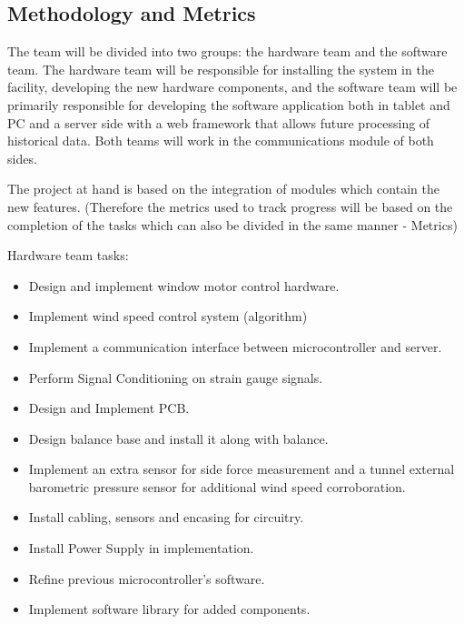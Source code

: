 \subsection{Methodology and Metrics}


	The team will be divided into two groups: the hardware team and the software team. The
	hardware team will be responsible for installing the system in the facility, developing the new
	hardware components, and the software team will be primarily responsible for developing the
	software application both in tablet and PC and a server side with a web framework that allows
	future processing of historical data. Both teams will work in the communications module of both
	sides.

	The project at hand is based on the integration of modules which contain the new features.
	(Therefore the metrics used to track progress will be based on the completion of the tasks which
	can also be divided in the same manner - Metrics)

	Hardware team tasks:
	\begin{itemize}
		\item Design and implement window motor control hardware.
		\item Implement wind speed control system (algorithm)
		\item Implement a communication interface between microcontroller and server.
		\item Perform Signal Conditioning on strain gauge signals.
		\item Design and Implement PCB.
		\item Design balance base and install it along with balance.
		\item Implement an extra sensor for side force measurement and a tunnel external barometric
			pressure sensor for additional wind speed corroboration.
		\item Install cabling, sensors and encasing for circuitry.
		\item Install Power Supply in implementation.
		\item Refine previous microcontroller’s software.
		\item Implement software library for added components.
	\end{itemize}

